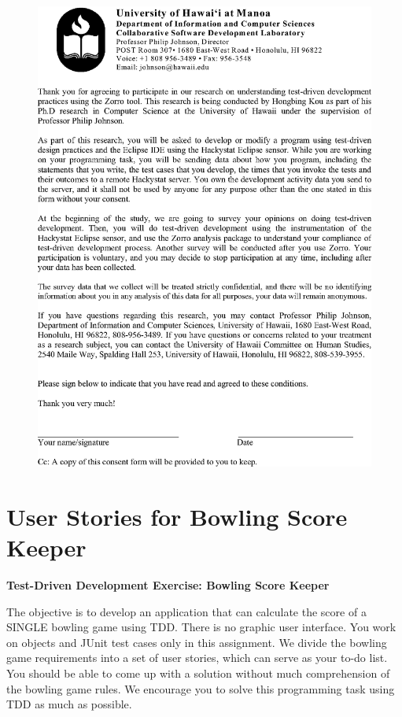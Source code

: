 \begin{figure}[htbp]
  \centering
  \includegraphics[height=1.0\textheight]{figs/ExtendedConsentForm.eps}
\end{figure}

\chapter{User Stories for Bowling Score Keeper}
\label{app:UserStoriesBSK}
\clearpage
\begin{center}
\LARGE{\textbf{Test-Driven Development Exercise: Bowling Score Keeper}}
\end{center}

The objective is to develop an application that can calculate the score
of a SINGLE bowling game using TDD. There is no graphic user
interface. You work on objects and JUnit test cases only in this
assignment. We divide the bowling game requirements into a set of user
stories, which can serve as your to-do list. You should be able to
come up with a solution without much comprehension of the bowling game
rules. We encourage you to solve this programming task using TDD as much
as possible.

